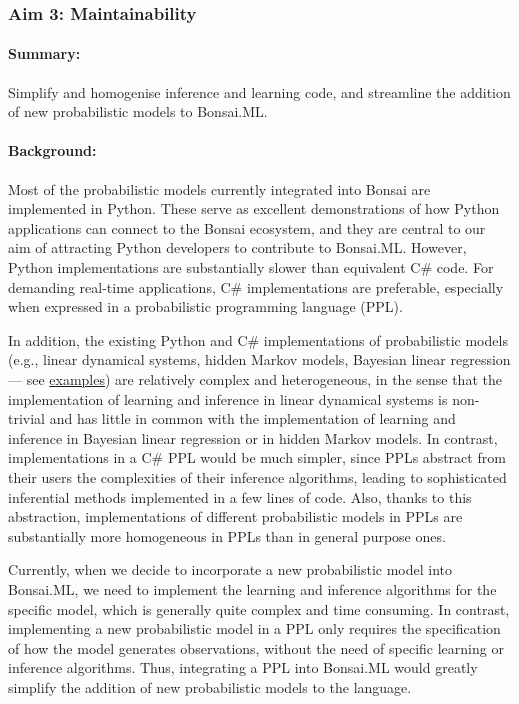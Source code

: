\subsubsection{Aim 3: Maintainability}

\paragraph{Summary:} Simplify and homogenise inference and learning code, and streamline the addition of new probabilistic models to Bonsai.ML.

\paragraph{Background:} Most of the probabilistic models currently integrated
into Bonsai are implemented in Python. These serve as excellent demonstrations
of how Python applications can connect to the Bonsai ecosystem, and they are
central to our aim of attracting Python developers to contribute to Bonsai.ML.
%
However, Python implementations are substantially slower than equivalent C\#
code. For demanding real-time applications, C\# implementations are preferable,
especially when expressed in a probabilistic programming language (PPL).

In addition, the existing Python and C\# implementations of probabilistic
models (e.g., linear dynamical systems, hidden Markov models, Bayesian linear
regression — see
\href{https://bonsai-rx.org/machinelearning/examples/README.html}{examples})
are relatively complex and heterogeneous, in the sense that the implementation
of learning and inference in linear dynamical systems is non-trivial and has
little in common with the implementation of learning and inference in Bayesian
linear regression or in hidden Markov models.
%
In contrast, implementations in a C\# PPL would be much simpler, since PPLs
abstract from their users the complexities of their inference algorithms,
leading to sophisticated inferential methods implemented in a few lines of
code.
%
Also, thanks to this abstraction, implementations of different probabilistic
models in PPLs are substantially more homogeneous in PPLs than in general
purpose ones.

Currently, when we decide to incorporate a new probabilistic model into
Bonsai.ML, we need to implement the learning and inference algorithms for the
specific model, which is generally quite complex and time consuming.
%
In contrast, implementing a new probabilistic model in a PPL only requires the
specification of how the model generates observations, without the
need of specific learning or inference algorithms.
%
Thus, integrating a PPL into Bonsai.ML would greatly simplify the addition of
new probabilistic models to the language.

